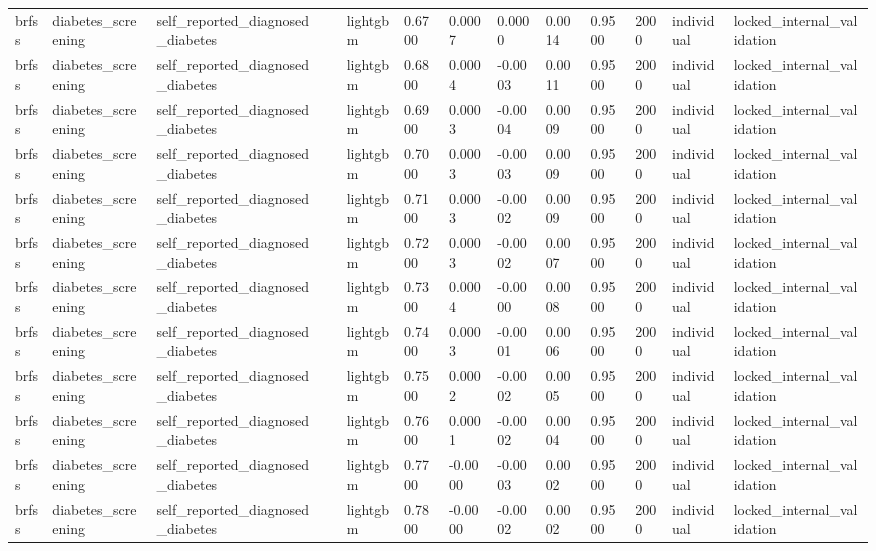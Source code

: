 \begin{tabular}{lllllllllllll}
brfss & diabetes\_screening & self\_reported\_diagnosed\_diabetes &  & lightgbm & 0.6700 & 0.0007 & 0.0000 & 0.0014 & 0.9500 & 2000 & individual & locked\_internal\_validation \\
brfss & diabetes\_screening & self\_reported\_diagnosed\_diabetes &  & lightgbm & 0.6800 & 0.0004 & -0.0003 & 0.0011 & 0.9500 & 2000 & individual & locked\_internal\_validation \\
brfss & diabetes\_screening & self\_reported\_diagnosed\_diabetes &  & lightgbm & 0.6900 & 0.0003 & -0.0004 & 0.0009 & 0.9500 & 2000 & individual & locked\_internal\_validation \\
brfss & diabetes\_screening & self\_reported\_diagnosed\_diabetes &  & lightgbm & 0.7000 & 0.0003 & -0.0003 & 0.0009 & 0.9500 & 2000 & individual & locked\_internal\_validation \\
brfss & diabetes\_screening & self\_reported\_diagnosed\_diabetes &  & lightgbm & 0.7100 & 0.0003 & -0.0002 & 0.0009 & 0.9500 & 2000 & individual & locked\_internal\_validation \\
brfss & diabetes\_screening & self\_reported\_diagnosed\_diabetes &  & lightgbm & 0.7200 & 0.0003 & -0.0002 & 0.0007 & 0.9500 & 2000 & individual & locked\_internal\_validation \\
brfss & diabetes\_screening & self\_reported\_diagnosed\_diabetes &  & lightgbm & 0.7300 & 0.0004 & -0.0000 & 0.0008 & 0.9500 & 2000 & individual & locked\_internal\_validation \\
brfss & diabetes\_screening & self\_reported\_diagnosed\_diabetes &  & lightgbm & 0.7400 & 0.0003 & -0.0001 & 0.0006 & 0.9500 & 2000 & individual & locked\_internal\_validation \\
brfss & diabetes\_screening & self\_reported\_diagnosed\_diabetes &  & lightgbm & 0.7500 & 0.0002 & -0.0002 & 0.0005 & 0.9500 & 2000 & individual & locked\_internal\_validation \\
brfss & diabetes\_screening & self\_reported\_diagnosed\_diabetes &  & lightgbm & 0.7600 & 0.0001 & -0.0002 & 0.0004 & 0.9500 & 2000 & individual & locked\_internal\_validation \\
brfss & diabetes\_screening & self\_reported\_diagnosed\_diabetes &  & lightgbm & 0.7700 & -0.0000 & -0.0003 & 0.0002 & 0.9500 & 2000 & individual & locked\_internal\_validation \\
brfss & diabetes\_screening & self\_reported\_diagnosed\_diabetes &  & lightgbm & 0.7800 & -0.0000 & -0.0002 & 0.0002 & 0.9500 & 2000 & individual & locked\_internal\_validation \\

\end{tabular}
